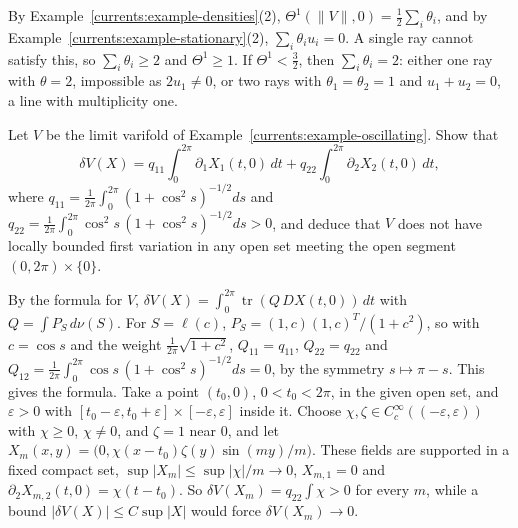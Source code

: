 \begin{solution}
By Example~\ref{currents:example-densities}(2), $\Theta^1(\|V\|, 0) = \frac12\sum_i\theta_i$, and by Example~\ref{currents:example-stationary}(2), $\sum_i\theta_iu_i = 0$. A single ray cannot satisfy this, so
$\sum_i\theta_i \geq 2$ and $\Theta^1 \geq 1$. If $\Theta^1 < \frac32$, then $\sum_i\theta_i = 2$: either one ray with $\theta = 2$, impossible as $2u_1 \neq 0$, or two rays with $\theta_1 = \theta_2 = 1$ and
$u_1 + u_2 = 0$, a line with multiplicity one.
\end{solution}

\begin{exercise}\label{currents:exercise-oscillating-variation}
Let $V$ be the limit varifold of Example~\ref{currents:example-oscillating}. Show that
\[
\delta V(X) = q_{11}\int_0^{2\pi}\partial_1X_1(t, 0)\,dt + q_{22}\int_0^{2\pi}\partial_2X_2(t, 0)\,dt,
\]
where
$q_{11} = \frac1{2\pi}\int_0^{2\pi}(1 + \cos^2s)^{-1/2}ds$ and $q_{22} = \frac1{2\pi}\int_0^{2\pi}\cos^2s\,(1 + \cos^2s)^{-1/2}ds > 0$, and deduce that $V$ does not have locally bounded first variation in
any open set meeting the open segment $(0, 2\pi) \times \{0\}$.
\end{exercise}

\begin{solution}
By the formula for $V$, $\delta V(X) = \int_0^{2\pi}\operatorname{tr}(Q\,DX(t, 0))\,dt$ with $Q = \int P_S\,d\nu(S)$. For $S = \ell(c)$, $P_S = (1, c)(1, c)^T/(1 + c^2)$, so with $c = \cos s$ and the weight
$\frac1{2\pi}\sqrt{1 + c^2}$, $Q_{11} = q_{11}$, $Q_{22} = q_{22}$ and $Q_{12} = \frac1{2\pi}\int_0^{2\pi}\cos s\,(1 + \cos^2s)^{-1/2}ds = 0$, by the symmetry $s \mapsto \pi - s$. This gives the formula. Take a
point $(t_0, 0)$, $0 < t_0 < 2\pi$, in the given open set, and $\varepsilon > 0$ with $[t_0 - \varepsilon, t_0 + \varepsilon] \times [-\varepsilon, \varepsilon]$ inside it. Choose $\chi, \zeta \in C^\infty_c((-\varepsilon, \varepsilon))$
with $\chi \geq 0$, $\chi \neq 0$, and $\zeta = 1$ near $0$, and let $X_m(x, y) = \bigl(0, \chi(x - t_0)\zeta(y)\sin(my)/m\bigr)$. These fields are supported in a fixed compact set, $\sup|X_m| \leq \sup|\chi|/m \to 0$,
$X_{m,1} = 0$ and $\partial_2X_{m,2}(t, 0) = \chi(t - t_0)$. So $\delta V(X_m) = q_{22}\int\chi > 0$ for every $m$, while a bound $|\delta V(X)| \leq C\sup|X|$ would force $\delta V(X_m) \to 0$.
\end{solution}
